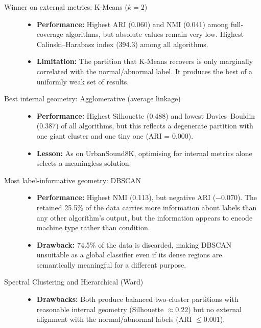 \documentclass[runningheads,a4paper,11pt]{report}
\begin{document}
\begin{description}
    \item[Winner on external metrics: K-Means ($k=2$)] \hfill
    \begin{itemize}
        \item \textbf{Performance:} Highest ARI (0.060) and NMI (0.041) among full-coverage algorithms, but absolute values remain very low. Highest Calinski--Harabasz index (394.3) among all algorithms.
        \item \textbf{Limitation:} The partition that K-Means recovers is only marginally correlated with the normal/abnormal label. It produces the best of a uniformly weak set of results.
    \end{itemize}

    \item[Best internal geometry: Agglomerative (average linkage)] \hfill
    \begin{itemize}
        \item \textbf{Performance:} Highest Silhouette (0.488) and lowest Davies--Bouldin (0.387) of all algorithms, but this reflects a degenerate partition with one giant cluster and one tiny one (ARI = 0.000).
        \item \textbf{Lesson:} As on UrbanSound8K, optimising for internal metrics alone selects a meaningless solution.
    \end{itemize}

    \item[Most label-informative geometry: DBSCAN] \hfill
    \begin{itemize}
        \item \textbf{Performance:} Highest NMI (0.113), but negative ARI ($-0.070$). The retained 25.5\% of the data carries more information about labels than any other algorithm's output, but the information appears to encode machine type rather than condition.
        \item \textbf{Drawback:} 74.5\% of the data is discarded, making DBSCAN unsuitable as a global classifier even if its dense regions are semantically meaningful for a different purpose.
    \end{itemize}

    \item[Spectral Clustering and Hierarchical (Ward)] \hfill
    \begin{itemize}
        \item \textbf{Drawbacks:} Both produce balanced two-cluster partitions with reasonable internal geometry (Silhouette $\approx 0.22$) but no external alignment with the normal/abnormal labels (ARI $\leq 0.001$).
    \end{itemize}
\end{description}
\end{document}

